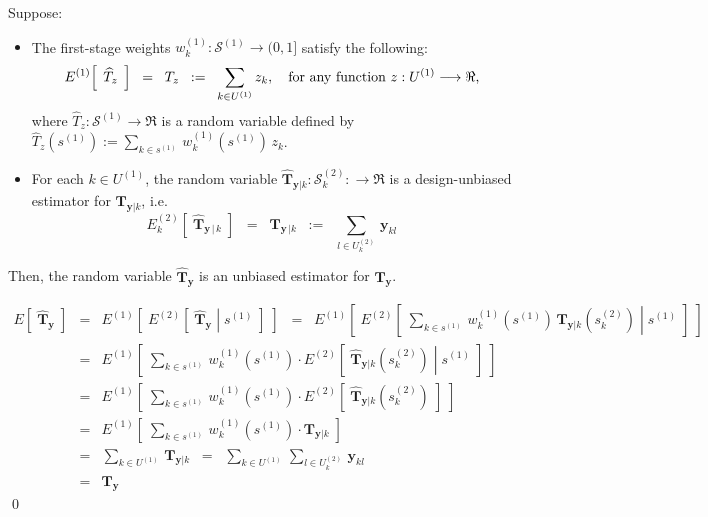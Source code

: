 \begin{proposition}
\quad
Suppose:
\begin{itemize}
\item	The first-stage weights $w^{(1)}_{k} : \mathcal{S}^{(1)} \longrightarrow (0,1]$
		satisfy the following:
		\begin{equation*}
		E^{(1)}\!\left[\;\,\widehat{T}_{z}\,\;\right] \;\; = \;\; T_{z} \;\;:=\;\; \sum_{k\in U^{(1)}}z_{k},
		\quad\textnormal{for any function $z : U^{(1)} \longrightarrow \Re$,}
		\end{equation*}
		where $\widehat{T}_{z} : \mathcal{S}^{(1)} \longrightarrow \Re$ is a random variable defined by
		$\widehat{T}_{z}(s^{(1)}) := \underset{k \in s^{(1)}}{\sum}\,w^{(1)}_{k}(s^{(1)})\,z_{k}$.
\item	For each $k \in U^{(1)}$, the random variable
		$\widehat{\mathbf{T}}_{\mathbf{y}\vert k} : \mathcal{S}^{(2)}_{k} : \longrightarrow \Re$
		is a design-unbiased
		estimator for $\mathbf{T}_{\mathbf{y}\vert k}$, i.e.
		\begin{equation*}
		E^{(2)}_{k}\!\left[\;\widehat{\mathbf{T}}_{\mathbf{y}\,\vert\,k}\;\right]
		\;\;=\;\; \mathbf{T}_{\mathbf{y}\,\vert k}
		\;\;:=\;\; \sum_{l \in U^{(2)}_{k}}\,\mathbf{y}_{kl}
		\end{equation*}
\end{itemize}
Then, the random variable $\widehat{\mathbf{T}}_{\mathbf{y}}$ is an unbiased estimator for $\mathbf{T}_{\mathbf{y}}$.
\end{proposition}

\proof
\begin{eqnarray*}
E\!\left[\;\widehat{\mathbf{T}}_{\mathbf{y}}\;\right]
&=& E^{(1)}\!\left[\;E^{(2)}\!\left[\;\left.\widehat{\mathbf{T}}_{\mathbf{y}}\;\right\vert\;s^{(1)}\;\right]\;\right]
\;\;=\;\; E^{(1)}\!\left[\;E^{(2)}\!\left[\;\left.
\sum_{k\in s^{(1)}}\,w^{(1)}_{k}(s^{(1)})\,\widehat{\mathbf{T}}_{\mathbf{y}\vert k}(s^{(2)}_{k})
\;\right\vert\;s^{(1)}\;\right]\;\right] \\
&=& E^{(1)}\!\left[\;
\sum_{k\in s^{(1)}}\,w^{(1)}_{k}(s^{(1)})
\cdot
E^{(2)}\!\left[\;\left.
\widehat{\mathbf{T}}_{\mathbf{y}\vert k}(s^{(2)}_{k})
\;\right\vert\;s^{(1)}\;\right]\;\right] \\
&=& E^{(1)}\!\left[\;
\sum_{k\in s^{(1)}}\,w^{(1)}_{k}(s^{(1)})
\cdot
E^{(2)}\!\left[\;\widehat{\mathbf{T}}_{\mathbf{y}\vert k}(s^{(2)}_{k})\;\right]
\;\right] \\
&=& E^{(1)}\!\left[\;
\sum_{k\in s^{(1)}}\,w^{(1)}_{k}(s^{(1)})
\cdot
\mathbf{T}_{\mathbf{y}\vert k}
\;\right] \\
&=&
\sum_{k\in U^{(1)}}\,\mathbf{T}_{\mathbf{y}\vert k}
\;\;=\;\;
\sum_{k\in U^{(1)}}\,\sum_{l \in U^{(2)}_{k}}\,\mathbf{y}_{kl}
\\
&=&
\mathbf{T}_{\mathbf{y}}
\end{eqnarray*}
\qed

